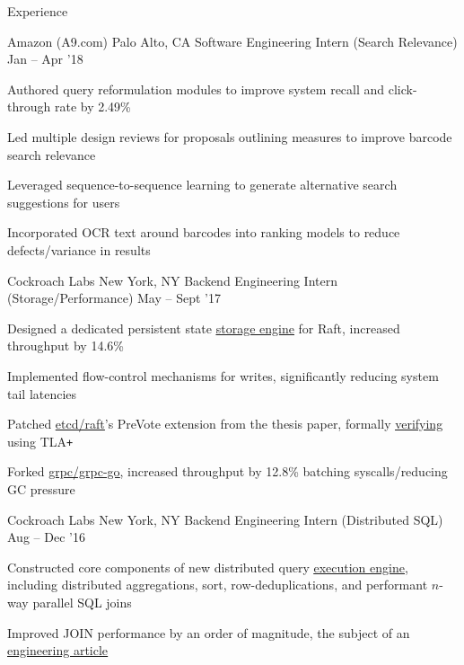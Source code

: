 \documentclass{resume} %
\begin{document}
\begin{rSection}{Experience}
  \begin{rWorkSection}{Amazon (A9.com)}
                     {Palo Alto, CA}
                     {Software Engineering Intern (Search Relevance)}
                     {Jan -- Apr '18}
    \item Authored query reformulation modules to improve system recall and
      click-through rate by 2.49\%
    \item Led multiple design reviews for proposals outlining measures to
      improve barcode search relevance
    \item Leveraged sequence-to-sequence learning to generate alternative
      search suggestions for users
    \item Incorporated OCR text around barcodes into ranking models to reduce
      defects/variance in results
  \end{rWorkSection}

  \begin{rWorkSection}{Cockroach Labs}
                     {New York, NY}
                     {Backend Engineering Intern (Storage/Performance)}
                     {May -- Sept '17}
    \item Designed a dedicated persistent state
      \href{https://github.com/cockroachdb/cockroach/pull/16361}{\underline
      {storage engine}} for Raft, increased throughput by 14.6\%
    \item Implemented flow-control mechanisms for writes, significantly reducing
      system tail latencies
    \item Patched
      \href{https://github.com/coreos/etcd/pull/8288}{\underline{etcd/raft}}'s
      PreVote extension from the thesis paper, formally
      \href{https://github.com/irfansharif/raft.tla/commit/22b05818b6bcfe6719a708f2270a1308fecbc0fa}{\underline {verifying}}
      using TLA\texttt{+}
    \item Forked \href{https://github.com/irfansharif/grpc-go}{\underline{grpc/grpc-go}},
      increased throughput by 12.8\% batching syscalls/reducing GC pressure
  \end{rWorkSection}

  \begin{rWorkSection}{Cockroach Labs}
                     {New York, NY}
                     {Backend Engineering Intern (Distributed SQL)}
                     {Aug -- Dec '16}
    \item Constructed core components of new distributed query
      \href{https://github.com/cockroachdb/cockroach/blob/master/docs/RFCS/20160421_distributed_sql.md}
      {\underline{execution engine}}, including distributed aggregations, sort,
      row-deduplications, and performant $n$-way parallel SQL joins
    \item Improved JOIN performance by an order of magnitude, the
      subject of an
      \href{https://www.cockroachlabs.com/blog/better-sql-joins-in-cockroachdb/}
      {\underline{engineering article}}
  \end{rWorkSection}


\end{rSection}
\end{document}
